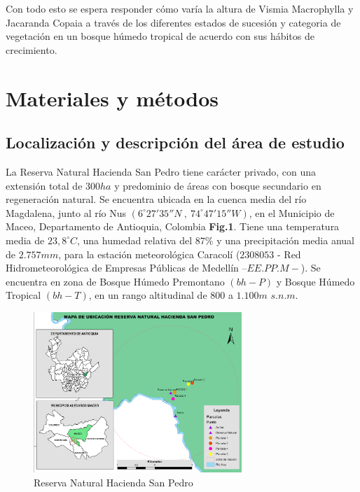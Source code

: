 \documentclass[letterpaper,9pt,onecolumn,twoside,]{pinp}
\begin{document}
Con todo esto se espera responder cómo varía la altura de Vismia
Macrophylla y Jacaranda Copaia a través de los diferentes estados de
sucesión y categoria de vegetación en un bosque húmedo tropical de acuerdo con sus hábitos de
crecimiento.

\hypertarget{materiales-y-muxe9todos}{%
\section{Materiales y métodos}\label{materiales-y-muxe9todos}}

\hypertarget{localizaciuxf3n-y-descripciuxf3n-del-uxe1rea-de-estudio}{%
\subsection{Localización y descripción del área de
estudio}\label{localizaciuxf3n-y-descripciuxf3n-del-uxe1rea-de-estudio}}

La Reserva Natural Hacienda San Pedro tiene carácter privado, con una
extensión total de \(300ha\) y predominio de áreas con bosque secundario
en regeneración natural. Se encuentra ubicada en la cuenca media del río
Magdalena, junto al río Nus
\((6^{\circ} 27'35'' N\ , \ 74^{\circ} 47'15'' W)\), en el Municipio
de Maceo, Departamento de Antioquia, Colombia \textbf{Fig.1}. Tiene una
temperatura media de \(23,8^{\circ}C\), una humedad relativa del
\(87\%\) y una precipitación media anual de \(2.757mm\), para la
estación meteorológica Caracolí (\(2308053\) - Red Hidrometeorológica de
Empresas Públicas de Medellín \(–EE.PP.M-\)). Se encuentra en zona de
Bosque Húmedo Premontano \((bh-P)\) y Bosque Húmedo Tropical \((bh-T)\),
en un rango altitudinal de \(800\) a \(1.100m\) \(s.n.m\).

\begin{figure}[h]
  \centering
  \includegraphics[width= 0.7\textwidth]{area.png}
  \caption{Reserva Natural Hacienda San Pedro}
\end{figure}
\end{document}
